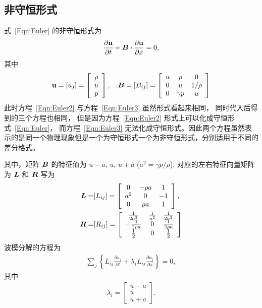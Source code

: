 \documentclass[10.5pt
]{article}
\begin{document}
\subsection{非守恒形式}
式~\eqref{Eqn:Euler} 的非守恒形式为
\begin{align}
\pdv{\vb u}{t} + \vb*B \vdot \pdv{\vb u}{x} = 0,
\label{Eqn:Euler3}
\end{align}
其中
\begin{align}
\vb u = [u_j] = \left[\begin{array}{c}\rho\\ u\\ p\end{array}\right], \quad \vb*B = [B_{ij}] = \left[\begin{array}{ccc}u & \rho & 0\\
0 & u & 1/\rho\\ 0 & \gamma p & u\end{array}\right]
\label{eq:8}
\end{align}
此时方程~\eqref{Eqn:Euler2} 与方程~\eqref{Eqn:Euler3} 虽然形式看起来相同，
同时代入后得到的三个方程也相同，
但是因为方程~\eqref{Eqn:Euler2} 形式上可以化成守恒形式~\eqref{Eqn:Euler}，
而方程~\eqref{Eqn:Euler3} 无法化成守恒形式。因此两个方程虽然表示的是同一个物理现象但是一个为守恒形式一个为非守恒形式，分别适用于不同的差分格式。

其中，矩阵 $\vb*B$ 的特征值为 $u-a$, $u$, $u+a$ ($a^2 = \gamma p/\rho$), 
对应的左右特征向量矩阵为 $\vb*L$ 和 $\vb*R$ 写为
\begin{align}
\vb*L =& [L_{ij}] = \left[\begin{array}{ccc}0 & -\rho a & 1\\ a^2 & 0 & -1\\ 0 & \rho a & 1\end{array}\right],
\\
\vb*R =& [R_{ij}] = \left[\begin{array}{ccc}\frac{1}{2a^2} & \frac{1}{a^2} & \frac{1}{2a^2}\\
-\frac{1}{2\rho a} & 0 & \frac{1}{2\rho a}\\ \frac{1}{2} & 0 & \frac{1}{2}\end{array}\right]
\end{align}
波模分解的方程为
\begin{align}
\sum_j \left\{L_{ij} \frac{\partial u_j}{\partial t} + \lambda_i L_{ij} \frac{\partial u_j}{\partial
x}\right\} = 0,
\end{align}
其中
\begin{align}
\lambda_i =
\left[\begin{array}{c}u-a \\ u\\ u+a\end{array}\right].
\end{align}
\end{document}
